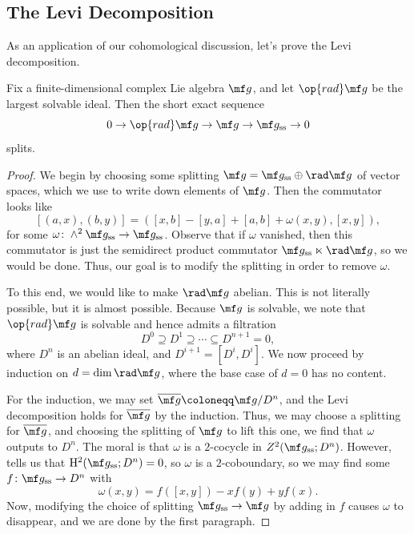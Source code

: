 \documentclass[../notes.tex]{subfiles}
\begin{document}
\subsection{The Levi Decomposition}
As an application of our cohomological discussion, let's prove the Levi decomposition.
\begin{theorem} \label{thm:levi}
	Fix a finite-dimensional complex Lie algebra $\mf g$, and let $\op{rad}\mf g$ be the largest solvable ideal. Then the short exact sequence
	\[0\to\op{rad}\mf g\to\mf g\to\mf g_{\mathrm{ss}}\to0\]
	splits.
\end{theorem}
\begin{proof}
	We begin by choosing some splitting $\mf g=\mf g_{\mathrm{ss}}\oplus\rad\mf g$ of vector spaces, which we use to write down elements of $\mf g$. Then the commutator looks like
	\[[(a,x),(b,y)]=([x,b]-[y,a]+[a,b]+\omega(x,y),[x,y]),\]
	for some $\omega\colon\land^2\mf g_{\mathrm{ss}}\to\mf g_{\mathrm{ss}}$. Observe that if $\omega$ vanished, then this commutator is just the semidirect product commutator $\mf g_{\mathrm{ss}}\ltimes\rad\mf g$, so we would be done. Thus, our goal is to modify the splitting in order to remove $\omega$.

	To this end, we would like to make $\rad\mf g$ abelian. This is not literally possible, but it is almost possible. Because $\mf g$ is solvable, we note that $\op{rad}\mf g$ is solvable and hence admits a filtration
	\[D^0\supseteq D^1\supseteq\cdots\subseteq D^{n+1}=0,\]where $D^n$ is an abelian ideal, and $D^{i+1}=\left[D^i,D^i\right]$. We now proceed by induction on $d=\dim\rad\mf g$, where the base case of $d=0$ has no content.

	For the induction, we may set $\overline{\mf g}\coloneqq\mf g/D^n$, and the Levi decomposition holds for $\overline{\mf g}$ by the induction. Thus, we may choose a splitting for $\overline{\mf g}$, and choosing the splitting of $\mf g$ to lift this one, we find that $\omega$ outputs to $D^n$. The moral is that $\omega$ is a $2$-cocycle in $Z^2(\mf g_{\mathrm{ss}};D^n)$. However,  tells us that $\mathrm H^2(\mf g_{\mathrm{ss}};D^n)=0$, so $\omega$ is a $2$-coboundary, so we may find some $f\colon\mf g_{\mathrm{ss}}\to D^n$ with
	\[\omega(x,y)=f([x,y])-xf(y)+yf(x).\]
	Now, modifying the choice of splitting $\mf g_{\mathrm{ss}}\to\mf g$ by adding in $f$ causes $\omega$ to disappear, and we are done by the first paragraph.
\end{proof}
\end{document}
